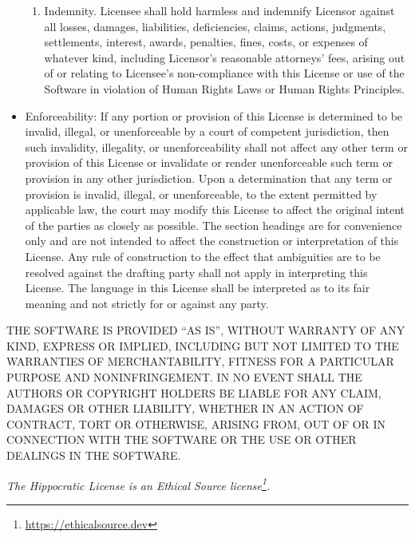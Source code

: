 \documentclass[krantzl]{krantz}
\newcommand{\hreffoot}[2]{{#1}\footnote{\href{#2}{#2}}}
\begin{document}
\begin{itemize}
\begin{enumerate}
\item 

Indemnity. Licensee shall hold harmless and indemnify Licensor against
    all losses, damages, liabilities, deficiencies, claims, actions,
    judgments, settlements, interest, awards, penalties, fines, costs, or
    expenses of whatever kind, including Licensor’s reasonable attorneys’
    fees, arising out of or relating to Licensee’s non-compliance with this
    License or use of the Software in violation of Human Rights Laws or
    Human Rights Principles.



\end{enumerate}


\item 

Enforceability: If any portion or provision of this License is determined to
     be invalid, illegal, or unenforceable by a court of competent jurisdiction,
     then such invalidity, illegality, or unenforceability shall not affect any
     other term or provision of this License or invalidate or render
     unenforceable such term or provision in any other jurisdiction. Upon a
     determination that any term or provision is invalid, illegal, or
     unenforceable, to the extent permitted by applicable law, the court may
     modify this License to affect the original intent of the parties as closely
     as possible. The section headings are for convenience only and are not
     intended to affect the construction or interpretation of this License. Any
     rule of construction to the effect that ambiguities are to be resolved
     against the drafting party shall not apply in interpreting this
     License. The language in this License shall be interpreted as to its fair
     meaning and not strictly for or against any party.



\end{itemize}

THE SOFTWARE IS PROVIDED “AS IS”, WITHOUT WARRANTY OF ANY KIND, EXPRESS OR
IMPLIED, INCLUDING BUT NOT LIMITED TO THE WARRANTIES OF MERCHANTABILITY, FITNESS
FOR A PARTICULAR PURPOSE AND NONINFRINGEMENT. IN NO EVENT SHALL THE AUTHORS OR
COPYRIGHT HOLDERS BE LIABLE FOR ANY CLAIM, DAMAGES OR OTHER LIABILITY, WHETHER
IN AN ACTION OF CONTRACT, TORT OR OTHERWISE, ARISING FROM, OUT OF OR IN
CONNECTION WITH THE SOFTWARE OR THE USE OR OTHER DEALINGS IN THE SOFTWARE.


\emph{The Hippocratic License is an \hreffoot{Ethical Source license}{https://ethicalsource.dev}.}
\end{document}
